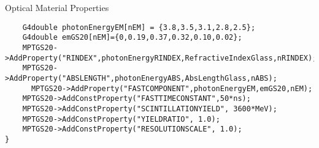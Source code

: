 \begin{frame}[fragile]{Optical Material Properties}
\begin{lstlisting}
    G4double photonEnergyEM[nEM] = {3.8,3.5,3.1,2.8,2.5};
    G4double emGS20[nEM]={0,0.19,0.37,0.32,0.10,0.02};
    MPTGS20->AddProperty("RINDEX",photonEnergyRINDEX,RefractiveIndexGlass,nRINDEX);
    MPTGS20->AddProperty("ABSLENGTH",photonEnergyABS,AbsLengthGlass,nABS);
	  MPTGS20->AddProperty("FASTCOMPONENT",photonEnergyEM,emGS20,nEM);
    MPTGS20->AddConstProperty("FASTTIMECONSTANT",50*ns);
    MPTGS20->AddConstProperty("SCINTILLATIONYIELD", 3600*MeV);
    MPTGS20->AddConstProperty("YIELDRATIO", 1.0);
    MPTGS20->AddConstProperty("RESOLUTIONSCALE", 1.0);
}
\end{lstlisting}
\hyperlink{G4LightMain}{}
\hyperlink{toc}{}
\end{frame}
